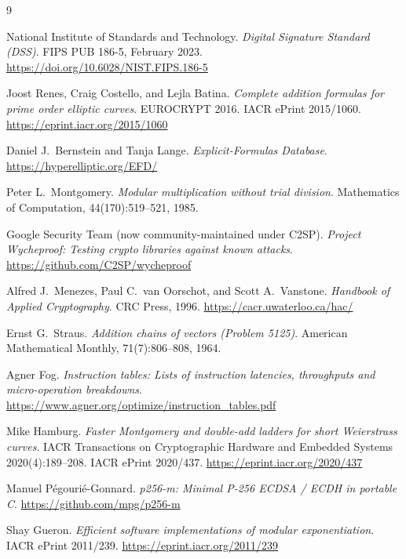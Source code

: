 \documentclass[11pt,a4paper]{article}
\begin{document}
\begin{thebibliography}{9}

National Institute of Standards and Technology.
\textit{Digital Signature Standard (DSS)}.
FIPS PUB 186-5, February 2023.
\url{https://doi.org/10.6028/NIST.FIPS.186-5}

Joost Renes, Craig Costello, and Lejla Batina.
\textit{Complete addition formulas for prime order elliptic curves}.
EUROCRYPT 2016. IACR ePrint 2015/1060.
\url{https://eprint.iacr.org/2015/1060}

Daniel J.\ Bernstein and Tanja Lange.
\textit{Explicit-Formulas Database}.
\url{https://hyperelliptic.org/EFD/}

Peter L.\ Montgomery.
\textit{Modular multiplication without trial division}.
Mathematics of Computation, 44(170):519--521, 1985.

Google Security Team (now community-maintained under C2SP).
\textit{Project Wycheproof: Testing crypto libraries against known attacks}.
\url{https://github.com/C2SP/wycheproof}

Alfred J.\ Menezes, Paul C.\ van Oorschot, and Scott A.\ Vanstone.
\textit{Handbook of Applied Cryptography}.
CRC Press, 1996.
\url{https://cacr.uwaterloo.ca/hac/}

Ernst G.\ Straus.
\textit{Addition chains of vectors (Problem 5125)}.
American Mathematical Monthly, 71(7):806--808, 1964.

Agner Fog.
\textit{Instruction tables: Lists of instruction latencies,
throughputs and micro-operation breakdowns}.
\url{https://www.agner.org/optimize/instruction_tables.pdf}

Mike Hamburg.
\textit{Faster Montgomery and double-add ladders for short Weierstrass curves}.
IACR Transactions on Cryptographic Hardware and Embedded Systems
2020(4):189--208. IACR ePrint 2020/437.
\url{https://eprint.iacr.org/2020/437}

Manuel P\'egouri\'e-Gonnard.
\textit{p256-m: Minimal P-256 ECDSA / ECDH in portable C}.
\url{https://github.com/mpg/p256-m}

Shay Gueron.
\textit{Efficient software implementations of modular exponentiation}.
IACR ePrint 2011/239.
\url{https://eprint.iacr.org/2011/239}

\end{thebibliography}
\end{document}
